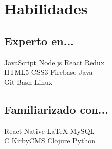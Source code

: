 \documentclass[letterpaper]{deedy-resume} %
\begin{document}
\begin{minipage}[t]{0.33\textwidth}
\section{Habilidades}

\subsection{Experto en...}
JavaScript \textbullet{} Node.js \textbullet{} React \textbullet{} Redux \\
HTML5 \textbullet{} CSS3 \textbullet{} Firebase \textbullet{} Java\\
Git \textbullet{} Bash \textbullet{} Linux\\

\sectionspace

\subsection{Familiarizado con...}
React Native \textbullet{} LaTeX \textbullet{} MySQL \\
C \textbullet{} KirbyCMS \textbullet{} Clojure \textbullet{} Python\\

\sectionspace


\end{minipage} %
\hfill
%
%
\end{document}
